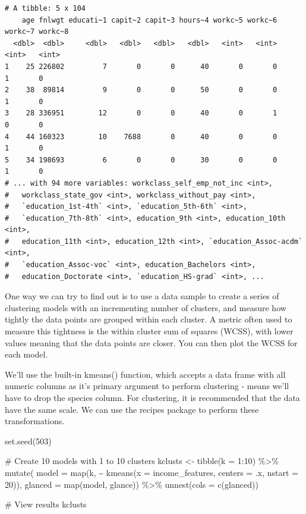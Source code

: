 \documentclass[
  letterpaper,
  DIV=11,
  numbers=noendperiod]{scrartcl}
\newenvironment{Shaded}{\begin{snugshade}}{\end{snugshade}}
\newcommand{\AttributeTok}[1]{\textcolor[rgb]{0.40,0.45,0.13}{#1}}
\newcommand{\CommentTok}[1]{\textcolor[rgb]{0.37,0.37,0.37}{#1}}
\newcommand{\DecValTok}[1]{\textcolor[rgb]{0.68,0.00,0.00}{#1}}
\newcommand{\FunctionTok}[1]{\textcolor[rgb]{0.28,0.35,0.67}{#1}}
\newcommand{\NormalTok}[1]{\textcolor[rgb]{0.00,0.23,0.31}{#1}}
\newcommand{\OtherTok}[1]{\textcolor[rgb]{0.00,0.23,0.31}{#1}}
\newcommand{\SpecialCharTok}[1]{\textcolor[rgb]{0.37,0.37,0.37}{#1}}
\begin{document}
\begin{verbatim}
# A tibble: 5 x 104
    age fnlwgt educati~1 capit~2 capit~3 hours~4 workc~5 workc~6 workc~7 workc~8
  <dbl>  <dbl>     <dbl>   <dbl>   <dbl>   <dbl>   <int>   <int>   <int>   <int>
1    25 226802         7       0       0      40       0       0       1       0
2    38  89814         9       0       0      50       0       0       1       0
3    28 336951        12       0       0      40       0       1       0       0
4    44 160323        10    7688       0      40       0       0       1       0
5    34 198693         6       0       0      30       0       0       1       0
# ... with 94 more variables: workclass_self_emp_not_inc <int>,
#   workclass_state_gov <int>, workclass_without_pay <int>,
#   `education_1st-4th` <int>, `education_5th-6th` <int>,
#   `education_7th-8th` <int>, education_9th <int>, education_10th <int>,
#   education_11th <int>, education_12th <int>, `education_Assoc-acdm` <int>,
#   `education_Assoc-voc` <int>, education_Bachelors <int>,
#   education_Doctorate <int>, `education_HS-grad` <int>, ...
\end{verbatim}

One way we can try to find out is to use a data sample to create a
series of clustering models with an incrementing number of clusters, and
measure how tightly the data points are grouped within each cluster. A
metric often used to measure this tightness is the within cluster sum of
squares (WCSS), with lower values meaning that the data points are
closer. You can then plot the WCSS for each model.

We'll use the built-in kmeans() function, which accepts a data frame
with all numeric columns as it's primary argument to perform clustering
- means we'll have to drop the species column. For clustering, it is
recommended that the data have the same scale. We can use the recipes
package to perform these transformations.

\begin{Shaded}
\begin{Highlighting}[]
\FunctionTok{set.seed}\NormalTok{(}\DecValTok{503}\NormalTok{)}

\CommentTok{\# Create 10 models with 1 to 10 clusters}
\NormalTok{kclusts }\OtherTok{\textless{}{-}} \FunctionTok{tibble}\NormalTok{(}\AttributeTok{k =} \DecValTok{1}\SpecialCharTok{:}\DecValTok{10}\NormalTok{) }\SpecialCharTok{\%\textgreater{}\%} 
  \FunctionTok{mutate}\NormalTok{(}
    \AttributeTok{model =} \FunctionTok{map}\NormalTok{(k, }\SpecialCharTok{\textasciitilde{}} \FunctionTok{kmeans}\NormalTok{(}\AttributeTok{x =}\NormalTok{ income\_features, }\AttributeTok{centers =}\NormalTok{ .x, }\AttributeTok{nstart =} \DecValTok{20}\NormalTok{)),}
    \AttributeTok{glanced =} \FunctionTok{map}\NormalTok{(model, glance)) }\SpecialCharTok{\%\textgreater{}\%} 
  \FunctionTok{unnest}\NormalTok{(}\AttributeTok{cols =} \FunctionTok{c}\NormalTok{(glanced))}

\CommentTok{\# View results}
\NormalTok{kclusts}
\end{Highlighting}
\end{Shaded}
\end{document}
